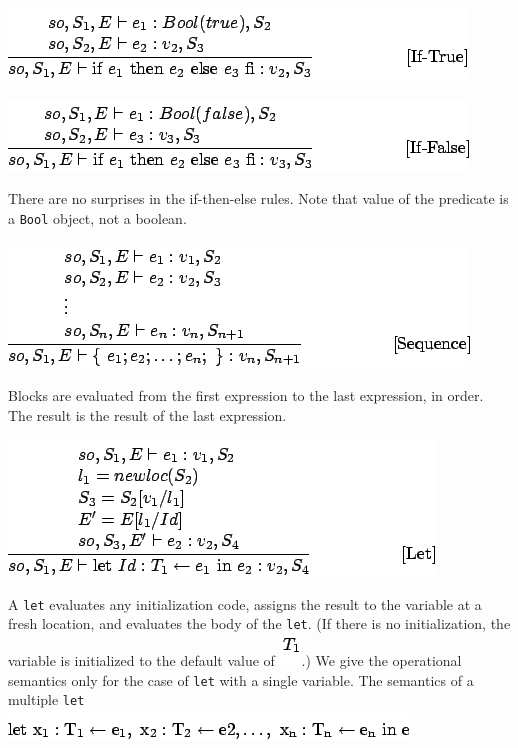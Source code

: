 \documentclass[]{article}
\begin{document}
\includegraphics{img168.png}

\includegraphics{img169.png}

There are no surprises in the if-then-else rules. Note that value of the
predicate is a \texttt{Bool} object, not a boolean.

\includegraphics{img170.png}

Blocks are evaluated from the first expression to the last expression,
in order. The result is the result of the last expression.

\includegraphics{img171.png}

A \texttt{let} evaluates any initialization code, assigns the result to
the variable at a fresh location, and evaluates the body of the
\texttt{let}. (If there is no initialization, the variable is
initialized to the default value of \includegraphics{img172.png}.) We
give the operational semantics only for the case of \texttt{let} with a
single variable. The semantics of a multiple \texttt{let} \\

\includegraphics{img173.png}
\end{document}
